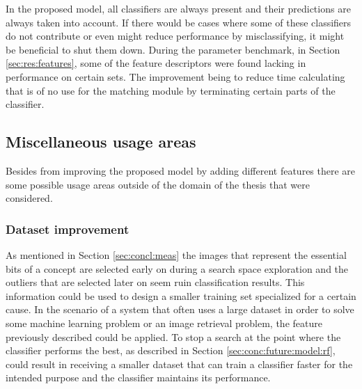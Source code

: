 In the proposed model, all classifiers are always present and their predictions are always taken into account. If there would be cases where some of these classifiers do not contribute or even might reduce performance by misclassifying, it might be beneficial to shut them down. During the parameter benchmark, in Section \ref{sec:res:features}, some of the feature descriptors were found lacking in performance on certain sets. The improvement being to reduce time calculating that is of no use for the matching module by terminating certain parts of the classifier.

\subsection{Miscellaneous usage areas}
\label{sec:conc:future:misc}
Besides from improving the proposed model by adding different features there are some possible usage areas outside of the domain of the thesis that were considered. 
\subsubsection{Dataset improvement}
\label{sec:conc:future:misc:data}

As mentioned in Section \ref{sec:concl:meas} the images that represent the essential bits of a concept are selected early on during a search space exploration and the outliers that are selected later on seem ruin classification results. This information could be used to design a smaller training set specialized for a certain cause. 
In the scenario of a system that often uses a large dataset in order to solve some machine learning problem or an image retrieval problem, the feature previously described could be applied.
To stop a search at the point where the classifier performs the best, as described in Section \ref{sec:conc:future:model:rf}, could result in receiving a smaller dataset that can train a classifier faster for the intended purpose and the classifier maintains its performance. 
